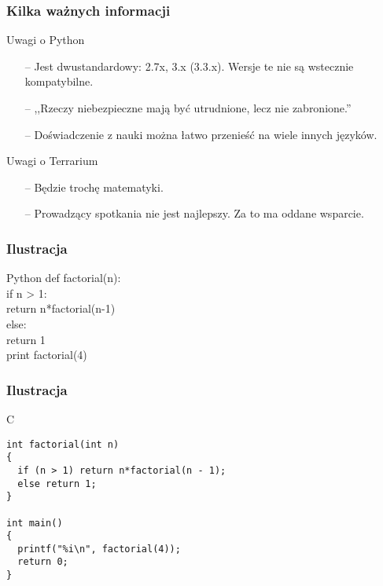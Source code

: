 \documentclass{beamer} \mode<presentation>
\begin{document}
\begin{frame}
\frametitle{Kilka ważnych informacji}

\begin{block}{Uwagi o Python}
\begin{itemize}
\item[--] Jest dwustandardowy: 2.7x, 3.x (3.3.x). Wersje te nie są wstecznie kompatybilne.
\item[--] ,,Rzeczy niebezpieczne mają być utrudnione, lecz nie zabronione.''
\item[--] Doświadczenie z nauki można łatwo przenieść na wiele innych języków.
\end{itemize}
\end{block}

\begin{block}{Uwagi o Terrarium}
\begin{itemize}
\item[--] Będzie trochę matematyki.
\item[--] Prowadzący spotkania nie jest najlepszy. Za to ma oddane wsparcie.
\end{itemize}
\end{block}
\end{frame}

\begin{frame}
\frametitle{Ilustracja}

\begin{block}{Python}
def factorial(n):\\
\hspace{5 mm}if n > 1:\\
\hspace{10 mm}return n*factorial(n-1)\\
\hspace{5 mm}else:\\
\hspace{10 mm}return 1\\
\vspace{8pt}
print factorial(4)
\end{block}

\end{frame}

\begin{frame}[fragile]
\frametitle{Ilustracja}

\begin{block}{C}
\begin{verbatim}
int factorial(int n)
{
  if (n > 1) return n*factorial(n - 1);
  else return 1;
}

int main()
{
  printf("%i\n", factorial(4));
  return 0;
}
\end{verbatim}
\end{block}

\end{frame}
\end{document}
